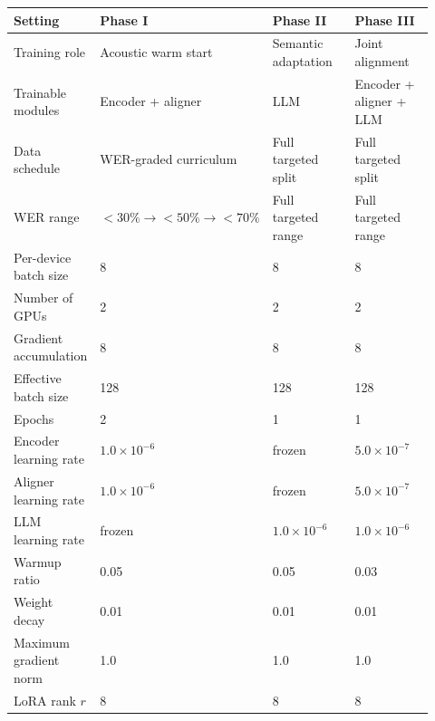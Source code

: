 \documentclass{llmxive}
\providecommand{\arraystretch}{1.05}
\begin{document}
\begin{table}[t]
\centering
\small
\renewcommand{\arraystretch}{1.13}
\begin{tabular}{p{0.20\linewidth} p{0.24\linewidth} p{0.24\linewidth} p{0.24\linewidth}}
\toprule
\textbf{Setting}
& \textbf{Phase I}
& \textbf{Phase II}
& \textbf{Phase III} \\
\midrule

Training role
& Acoustic warm start
& Semantic adaptation
& Joint alignment \\

Trainable modules
& Encoder + aligner
& LLM
& Encoder + aligner + LLM \\

Data schedule
& WER-graded curriculum
& Full targeted split
& Full targeted split \\

WER range
& $<30\% \rightarrow <50\% \rightarrow <70\%$
& Full targeted range
& Full targeted range \\

Per-device batch size
& 8
& 8
& 8 \\

Number of GPUs
& 2
& 2
& 2 \\

Gradient accumulation
& 8
& 8
& 8 \\

Effective batch size
& 128
& 128
& 128 \\

Epochs
& 2
& 1
& 1 \\

Encoder learning rate
& $1.0 \times 10^{-6}$
& frozen
& $5.0 \times 10^{-7}$ \\

Aligner learning rate
& $1.0 \times 10^{-6}$
& frozen
& $5.0 \times 10^{-7}$ \\

LLM learning rate
& frozen
& $1.0 \times 10^{-6}$
& $1.0 \times 10^{-6}$ \\

Warmup ratio
& 0.05
& 0.05
& 0.03 \\

Weight decay
& 0.01
& 0.01
& 0.01 \\

Maximum gradient norm
& 1.0
& 1.0
& 1.0 \\

LoRA rank $r$
& 8
& 8
& 8 \\


\end{tabular}
\end{table}
\end{document}
